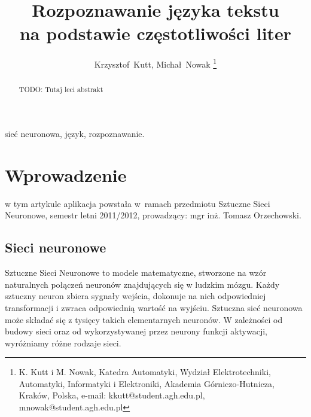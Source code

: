 \documentclass[journal]{IEEEtran}
\begin{document}
%
\title{Rozpoznawanie języka tekstu \\ na podstawie częstotliwości liter}

\author{Krzysztof~Kutt, Michał~Nowak
\thanks{K. Kutt i M. Nowak, Katedra Automatyki, Wydział Elektrotechniki, Automatyki, Informatyki i Elektroniki,
Akademia Górniczo-Hutnicza, Kraków, Polska, e-mail: kkutt@student.agh.edu.pl, mnowak@student.agh.edu.pl}}

\maketitle


\begin{abstract}
TODO: Tutaj leci abstrakt
\end{abstract}

\begin{IEEEkeywords}
sieć neuronowa, język, rozpoznawanie.
\end{IEEEkeywords}


\section{Wprowadzenie}
% 
% 
% 
% 
 w tym artykule aplikacja powstała w~ramach przedmiotu
Sztuczne Sieci Neuronowe, semestr letni 2011/2012, prowadzący: mgr inż. Tomasz Orzechowski.

\subsection{Sieci neuronowe}
Sztuczne Sieci Neuronowe to modele matematyczne, stworzone na wzór naturalnych połączeń neuronów
znajdujących się w ludzkim mózgu. Każdy sztuczny neuron zbiera sygnały wejścia, dokonuje na nich
odpowiedniej transformacji i zwraca odpowiednią wartość na wyjściu. Sztuczna sieć neuronowa może
składać się z tysięcy takich elementarnych neuronów. W zależności od budowy sieci oraz od wykorzystywanej
przez neurony funkcji aktywacji, wyróżniamy różne rodzaje sieci.
\end{document}
